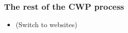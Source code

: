 \begin{frame}
\frametitle{The rest of the CWP process}

\begin{itemize}
\item (Switch to websites)
\end{itemize}

\end{frame}


